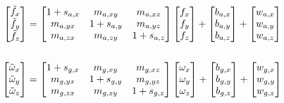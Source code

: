 \begin{align} \label{eq: expanded IMU forward error model}
	\begin{bmatrix} \tilde{f}_x \\ \tilde{f}_y \\ \tilde{f}_z \end{bmatrix} &= \begin{bmatrix} 1 + s_{a,x} & m_{a,xy} & m_{a,xz} \\ m_{a,yx} & 1 + s_{a,y} & m_{a,yz} \\ m_{a,zx} & m_{a,zy} & 1 + s_{a,z} \end{bmatrix} \begin{bmatrix} f_x \\ f_y \\ f_z \end{bmatrix} + \begin{bmatrix} b_{a,x} \\ b_{a,y} \\ b_{a,z} \end{bmatrix} + \begin{bmatrix} w_{a,x} \\ w_{a,y} \\ w_{a,z} \end{bmatrix} \notag\\
	\\
	\begin{bmatrix} \tilde{\omega}_x \\ \tilde{\omega}_y \\ \tilde{\omega}_z \end{bmatrix} &= \begin{bmatrix} 1 + s_{g,x} & m_{g,xy} & m_{g,xz} \\ m_{g,yx} & 1 + s_{g,y} & m_{g,yz} \\ m_{g,zx} & m_{g,zy} & 1 + s_{g,z} \end{bmatrix} \begin{bmatrix} \omega_x \\ \omega_y \\ \omega_z \end{bmatrix} + \begin{bmatrix} b_{g,x} \\ b_{g,y} \\ b_{g,z} \end{bmatrix} + \begin{bmatrix} w_{g,x} \\ w_{g,y} \\ w_{g,z} \end{bmatrix} \notag
\end{align}


